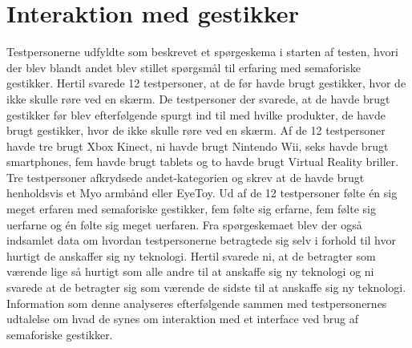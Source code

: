 \section{Interaktion med gestikker}
\label{TestresultaterInteraktioner}
%
Testpersonerne udfyldte som beskrevet et spørgeskema i starten af testen, hvori der blev blandt andet blev stillet spørgsmål til erfaring med semaforiske gestikker. Hertil svarede 12 testpersoner, at de før havde brugt gestikker, hvor de ikke skulle røre ved en skærm. De testpersoner der svarede, at de havde brugt gestikker før blev efterfølgende spurgt ind til med hvilke produkter, de havde brugt gestikker, hvor de ikke skulle røre ved en skærm. Af de 12 testpersoner havde tre brugt Xbox Kinect, ni havde brugt Nintendo Wii, seks havde brugt smartphones, fem havde brugt tablets og to havde brugt Virtual Reality briller. Tre testpersoner afkrydsede andet-kategorien og skrev at de havde brugt henholdsvis et Myo armbånd eller EyeToy. Ud af de 12 testpersoner følte én sig meget erfaren med semaforiske gestikker, fem følte sig erfarne, fem følte sig uerfarne og én følte sig meget uerfaren. Fra spørgeskemaet blev der også indsamlet data om hvordan testpersonerne betragtede sig selv i forhold til hvor hurtigt de anskaffer sig ny teknologi. Hertil svarede ni, at de betragter som værende lige så hurtigt som alle andre til at anskaffe sig ny teknologi og ni svarede at de betragter sig som værende de sidste til at anskaffe sig ny teknologi. Information som denne analyseres efterfølgende sammen med testpersonernes udtalelse om hvad de synes om interaktion med et interface ved brug af semaforiske gestikker.  \blankline

